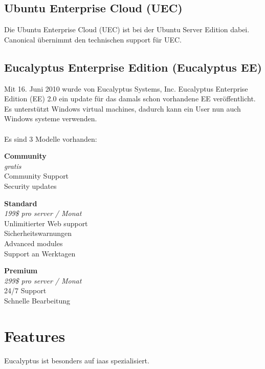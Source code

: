 \documentclass[a4paper,nochapterprefix,english,12pt]{scrreprt}
\begin{document}
\subsection{Ubuntu Enterprise Cloud (UEC)}
Die Ubuntu Enterprise Cloud (UEC) ist bei der Ubuntu Server Edition dabei. Canonical übernimmt den technischen support für UEC. \cite{EucalyptusBegGuide}
\subsection{Eucalyptus Enterprise Edition (Eucalyptus EE)}
Mit 16. Juni 2010 wurde von  Eucalyptus Systems, Inc. Eucalyptus Enterprise Edition (EE) 2.0 ein update für das damals schon vorhandene EE veröffentlicht. Es unterstützt Windows virtual machines, dadurch kann ein User nun auch Windows systeme verwenden. \cite{EucalyptusEELaunch}\\ \\
Es sind 3 Modelle vorhanden: \\
\begin{minipage}[t]{.2\textwidth}
\textbf{Community} \\
\textit{gratis} \\
Community Support\\
Security updates
\end{minipage}
\begin{minipage}[t]{.05\textwidth}
\hspace{1.0\textwidth}
\end{minipage}
\begin{minipage}[t]{.3\textwidth}
\textbf{Standard} \\
\textit{199\$ pro server / Monat} \\
Unlimitierter Web support \\
Sicherheitswarnungen \\
Advanced modules \\
Support an Werktagen
\end{minipage}
\begin{minipage}[t]{.05\textwidth}
\hspace{1.0\textwidth}
\end{minipage}
\begin{minipage}[t]{.3\textwidth}
\textbf{Premium} \\
\textit{299\$ pro server / Monat} \\
24/7 Support \\
Schnelle Bearbeitung
\end{minipage}
\cite{EucalyptusPric}
\section{Features}
Eucalyptus ist besonders auf \gls{iaas} spezialisiert.
\end{document}
